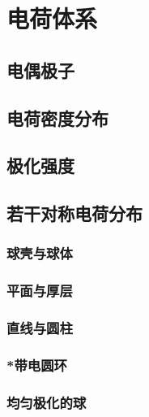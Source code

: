 

\section{电荷体系}\label{15-4}

\subsection{电偶极子}\label{15-4-1}

\subsection{电荷密度分布}\label{15-4-2}

\subsection{极化强度}\label{15-4-3}

\subsection{若干对称电荷分布}\label{15-4-4}

\subsubsection{球壳与球体}\label{15-4-4-1}

\subsubsection{平面与厚层}\label{15-4-4-2}

\subsubsection{直线与圆柱}\label{15-4-4-3}

\subsubsection{*带电圆环}\label{15-4-4-4}

\subsubsection{均匀极化的球}\label{15-4-4-5}